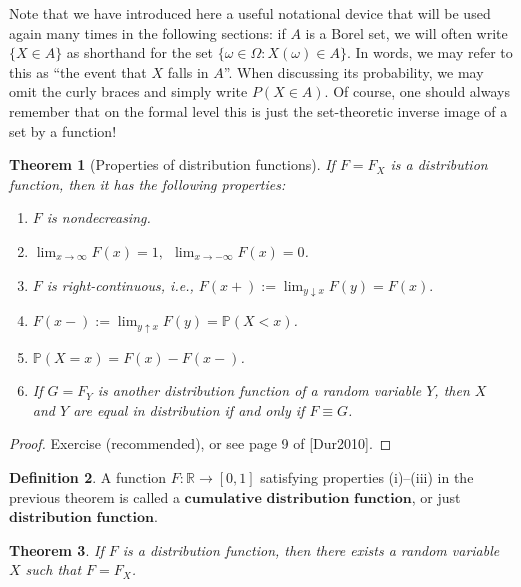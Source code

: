 \documentclass[11pt]{report}
\newcommand{\R}{\mathbb{R}}
\theoremstyle{plain}
\newtheorem{thm}{Theorem}[chapter]
\theoremstyle{definition}
\newtheorem{defn}[thm]{Definition}
\begin{document}
\noindent Note that we have introduced here a useful notational
device that will be used again many times in the
following sections: if $A$ is a Borel set, we will
often write $\{X \in A\}$ as shorthand for the set
$\{ \omega \in \Omega : X(\omega) \in A \}$. In
words, we may refer to this as ``the event that $X$
falls in $A$''. When discussing its probability, we
may omit the curly braces and simply write
$P(X\in A)$. Of course, one should always remember
that on the formal level this is just the
set-theoretic inverse image of a set by a function!

\begin{thm}[Properties of distribution functions]
If $F=F_X$ is a distribution function, then it has
the following properties:

\begin{enumerate}[label=(\roman*)]
\item $F$ is nondecreasing.

\item $\lim_{x\to\infty} F(x) = 1, \ \ \lim_{x\to-\infty}
F(x) = 0$.

\item $F$ is right-continuous, i.e.,
$F(x+) := \lim_{y\downarrow x} F(y) = F(x).$

\item $F(x-) := \lim_{y\uparrow x} F(y) = \mathbb{P}(X <
x)$.

\item $\mathbb{P}(X=x) = F(x) - F(x-)$.

\item If $G=F_Y$ is another distribution function of a
random variable $Y$, then $X$ and $Y$ are equal in
distribution if and only if $F \equiv G$.
\end{enumerate}

\end{thm}

\begin{proof}
Exercise (recommended), or see page 9 of [Dur2010].
\end{proof}

\begin{defn}
A function $F:\R\to[0,1]$ satisfying properties
(i)--(iii) in the previous theorem is called a
$\textbf{cumulative distribution function}$, or just
$\textbf{distribution function}$.
\end{defn}

\begin{thm}
\label{thm-rvexistence}
If $F$ is a distribution function, then there exists
a random variable $X$ such that $F=F_X$.
\end{thm}
\end{document}
